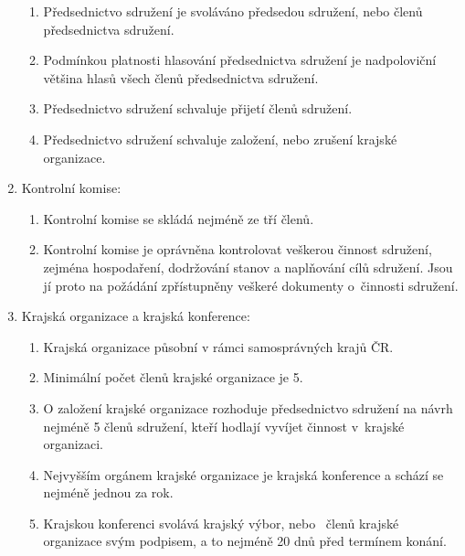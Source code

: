 \documentclass[a4paper]{article}
\begin{document}
\begin{enumerate}
\begin{enumerate}
        \item Předsednictvo sdružení je svoláváno předsedou sdružení, nebo
             členů předsednictva sdružení.

        \item Podmínkou platnosti hlasování předsednictva sdružení je
            nadpoloviční většina hlasů všech členů předsednictva sdružení.

        \item Předsednictvo sdružení schvaluje přijetí členů sdružení.

        \item Předsednictvo sdružení schvaluje založení, nebo zrušení krajské organizace.
        \end{enumerate}

    \item Kontrolní komise:
        \begin{enumerate}
        \item Kontrolní komise se skládá nejméně ze tří členů.

        \item Kontrolní komise je oprávněna kontrolovat veškerou činnost sdružení,
            zejména hospodaření, dodržování stanov a naplňování cílů sdružení.
            Jsou jí proto na požádání zpřístupněny veškeré dokumenty o~činnosti
            sdružení.
        \end{enumerate}

    \item Krajská organizace a krajská konference:
        \begin{enumerate}
        \item Krajská organizace působní v rámci samosprávných krajů ČR.

        \item Minimální počet členů krajské organizace je 5.

        \item O založení krajské organizace rozhoduje předsednictvo sdružení na
            návrh nejméně 5 členů sdružení, kteří hodlají vyvíjet činnost
            v~krajské organizaci.

        \item Nejvyšším orgánem krajské organizace je krajská konference a schází
            se nejméně jednou za rok.

        \item Krajskou konferenci svolává krajský výbor, nebo
            ~členů krajské organizace svým podpisem, a to
            nejméně 20 dnů před termínem konání.


\end{enumerate}
\end{enumerate}
\end{document}
